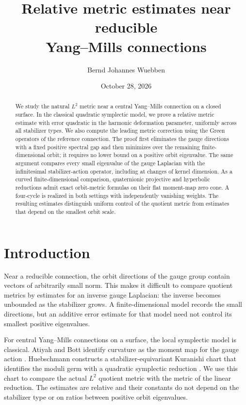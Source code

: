 \documentclass[11pt]{amsart}
\title[Relative metrics near reducible Yang--Mills connections]{Relative metric estimates near reducible \\Yang--Mills connections}
\author{Bernd Johannes Wuebben}
\date{October 28, 2026}
\theoremstyle{definition}
\theoremstyle{remark}
\begin{document}
\begin{abstract}
We study the natural $L^2$ metric near a central Yang--Mills connection
on a closed surface. In the classical quadratic symplectic model, we
prove a relative metric estimate with error quadratic in the harmonic
deformation parameter, uniformly across all stabilizer types. We also
compute the leading metric correction using the Green operators of the
reference connection. The proof first eliminates the gauge directions
with a fixed positive spectral gap and then minimizes over the remaining
finite-dimensional orbit; it requires no lower bound on a positive
orbit eigenvalue. The same argument compares every small eigenvalue of
the gauge Laplacian with the infinitesimal stabilizer-action operator,
including at changes of kernel dimension. As a curved finite-dimensional
comparison, quaternionic projective and hyperbolic reductions admit
exact orbit-metric formulas on their flat moment-map zero cone. A
four-cycle is realized in both settings with independently vanishing
weights. The resulting estimates distinguish uniform control of the
quotient metric from estimates that depend on the smallest orbit scale.
\end{abstract}
\maketitle

\section{Introduction}

Near a reducible connection, the orbit directions of the gauge group
contain vectors of arbitrarily small norm. This makes it difficult to
compare quotient metrics by estimates for an inverse gauge Laplacian:
the inverse becomes unbounded as the stabilizer grows. A finite-dimensional
model records the small directions, but an additive error estimate for
that model need not control its smallest positive eigenvalues.

For central Yang--Mills connections on a surface, the local symplectic
model is classical. Atiyah and Bott identify curvature as the moment
map for the gauge action \cite{AB83}. Huebschmann constructs a
stabilizer-equivariant Kuranishi chart that identifies the moduli germ
with a quadratic symplectic reduction \cite{Hue95,Hue96}. We use this
chart to compare the actual $L^2$ quotient metric with the metric of the
linear reduction. The estimates are relative and their constants do not
depend on the stabilizer type or on ratios between positive orbit
eigenvalues.
\end{document}
